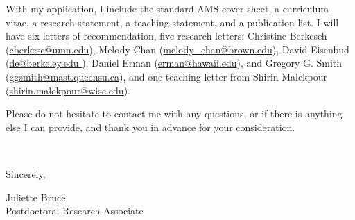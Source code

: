 \documentclass[11pt]{article}
\begin{document}


With my application, I include the standard AMS cover sheet, a curriculum vitae, a research statement, a teaching statement, and a publication list. I will have six letters of recommendation, five research letters: Christine Berkesch (\href{mailto:cberkesc@umn.edu}{cberkesc@umn.edu}), Melody Chan (\href{mailto:melody\_chan@brown.edu}{melody\_chan@brown.edu}), David Eisenbud (\href{mailto:de@berkeley.edu }{de@berkeley.edu }), Daniel Erman (\href{mailto:erman@hawaii.edu}{erman@hawaii.edu}), and Gregory G. Smith (\href{mailto:ggsmith@mast.queensu.ca}{ggsmith@mast.queensu.ca}), and one teaching letter from Shirin Malekpour (\href{mailto:shirin.malekpour@wisc.edu}{shirin.malekpour@wisc.edu}).  

Please do not hesitate to contact me with any questions, or if there is anything else I can provide, and thank you in advance for your consideration. 

\vspace{24pt}
\noindent
\begin{minipage}{0.99\textwidth}
\begin{minipage}{0.69\textwidth}
\textcolor{white}{.}
\end{minipage}
\begin{minipage}{0.29\textwidth}
Sincerely, 

\vspace{36pt}
Juliette Bruce\\
Postdoctoral Research Associate\end{minipage}
\end{minipage}

\end{document}
